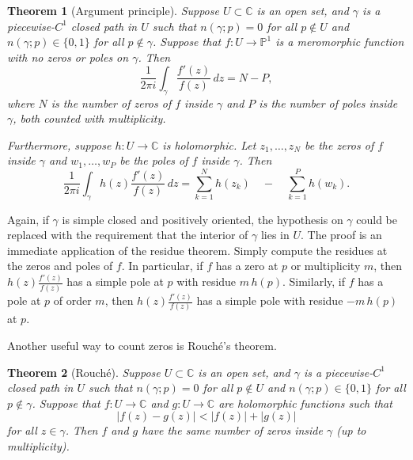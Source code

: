 \documentclass[12pt,openany]{book}
\newcommand{\sabs}[1]{\lvert {#1} \rvert}
\newcommand{\C}{{\mathbb{C}}}
\newcommand{\bP}{{\mathbb{P}}}
\theoremstyle{plain}
\newtheorem{thm}{Theorem}[section]
\theoremstyle{remark}
\theoremstyle{definition}
\theoremstyle{exercise}
\theoremstyle{example}
\begin{document}
\begin{thm}[Argument principle]\label{thm:onevarargprinc}
Suppose $U \subset \C$ is an open set, and $\gamma$ is a piecewise-$C^1$
closed path in $U$ such that
$n(\gamma;p)=0$ for all $p \not\in U$ and $n(\gamma;p) \in \{ 0,1 \}$ for
all $p \not\in \gamma$.
Suppose that $f \colon U \to \bP^1$ is a meromorphic function with no zeros
or poles on $\gamma$.
Then
\begin{equation*}
\frac{1}{2\pi i}
\int_\gamma \frac{f'(z)}{f(z)} \, dz
= N - P ,
\end{equation*}
where $N$ is the number of zeros of $f$ inside $\gamma$ and $P$ is the
number of poles inside $\gamma$, both counted with multiplicity.

Furthermore, suppose $h \colon U \to \C$ is holomorphic.
Let $z_1,\ldots,z_N$ be the zeros of $f$ inside $\gamma$ and
$w_1,\ldots,w_P$ be the poles of $f$ inside $\gamma$.
Then
\begin{equation*}
\frac{1}{2\pi i}
\int_\gamma h(z) \frac{f'(z)}{f(z)} \, dz
=
\sum_{k=1}^N h(z_k)
\quad
-
\quad
\sum_{k=1}^P h(w_k) .
\end{equation*}
\end{thm}

Again, if $\gamma$ is simple closed and positively oriented,
the hypothesis on $\gamma$ could be replaced with the requirement that
the interior of $\gamma$ lies in $U$.
The proof is an immediate application of the residue theorem.  Simply
compute the residues at the zeros and poles of $f$.  In particular,
if $f$ has a zero at $p$ or multiplicity $m$, then $h(z) \frac{f'(z)}{f(z)}$
has a simple pole
at $p$ with residue $m\, h(p)$.  Similarly, if $f$ has a pole at $p$ of
order $m$,
then $h(z) \frac{f'(z)}{f(z)}$ has a simple pole with residue $-m\, h(p)$ at $p$.

Another useful way to count zeros is Rouch\'e's theorem.

\begin{thm}[Rouch\'e]\label{thm:onevarrouche}
Suppose $U \subset \C$ is an open set, and $\gamma$ is a piecewise-$C^1$
closed path in $U$ such that
$n(\gamma;p)=0$ for all $p \not\in U$ and $n(\gamma;p) \in \{ 0,1 \}$ for
all $p \not\in \gamma$.
Suppose that $f \colon U \to \C$ and $g \colon U \to \C$
are holomorphic functions such that
\begin{equation*}
\sabs{f(z)-g(z)} < \sabs{f(z)}+\sabs{g(z)}
\end{equation*}
for all $z \in \gamma$.  Then $f$ and $g$
have the same number of zeros
inside $\gamma$ (up to multiplicity).
\end{thm}
\end{document}
